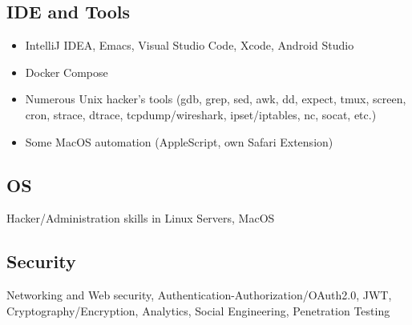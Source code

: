 \subsection*{IDE and Tools}
\begin{itemize}[noitemsep, nosep]
  \item IntelliJ IDEA, Emacs, Visual Studio Code, Xcode, Android Studio
  \item Docker Compose
  \item Numerous Unix hacker’s tools (gdb, grep, sed, awk, dd, expect, tmux, screen, cron, strace, dtrace, tcpdump/wireshark, ipset/iptables, nc, socat, etc.)
  \item Some MacOS automation (AppleScript, own Safari Extension)
\end{itemize}

\subsection*{OS}
Hacker/Administration skills in Linux Servers, MacOS

\subsection*{Security}
Networking and Web security, Authentication-Authorization/OAuth2.0, JWT, Cryptography/Encryption, Analytics, Social Engineering, Penetration Testing
